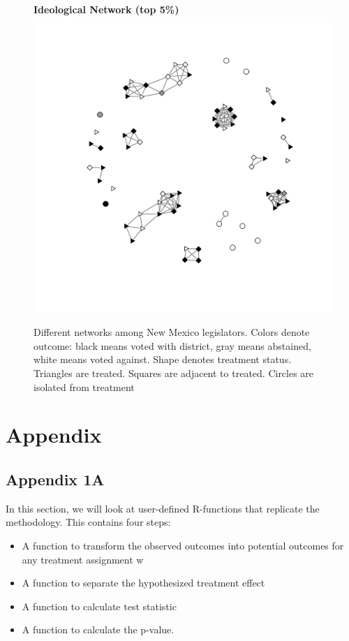\documentclass[12pt]{article}
\begin{document}
\begin{figure}
\begin{tabular}{cc}
\end{tabular}
{\bf Ideological Network (top 5\%)} \\
\includegraphics[scale=.55, clip=true,trim =2cm 2cm 2cm 2cm]{./images/coppock_ideological_net.pdf}
\caption{Different networks among New Mexico legislators. Colors denote outcome: black means voted with district, gray means abstained, white means voted against. Shape denotes treatment status. Triangles are treated. Squares are adjacent to treated. Circles are isolated from treatment}
\label{fig:nh-nets}
\end{figure}


\section{Appendix}
\subsection{Appendix 1A}

In this section, we will look at user-defined R-functions that replicate the \citep{bowers2012reasoning} methodology. This contains four steps:

\begin{itemize}
\item A function to transform the observed outcomes into potential outcomes for any treatment assignment w
\item A function to separate the hypothesized treatment effect
\item A function to calculate test statistic
\item A function to calculate the p-value.
\end{itemize}
\end{document}
